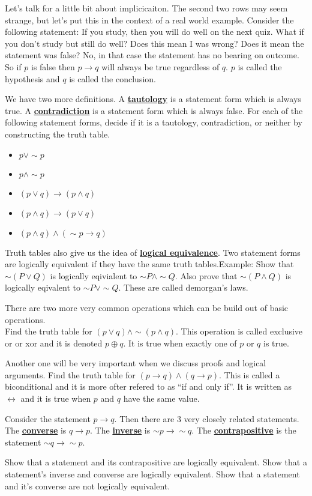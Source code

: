 \documentclass[14,fleqn]{article}
\newcommand{\defn}[1]{\textbf{\underline{#1}}}
\begin{document}
Let's talk for a little bit about implicicaiton. The second two rows may seem strange, but let's put this in the context of a real world example. Consider the following statement: If you study, then you will do well on the next quiz. What if you don't study but still do well? Does this mean I was wrong? Does it mean the statement was false? No, in that case the statement has no bearing on outcome.  So if $p$ is false then $p\to q$ will always be true regardless of $q.$ $p$ is called the hypothesis and $q$ is called the conclusion.

We have two more definitions. A \defn{tautology} is a statement form which is always true. A \defn{contradiction} is a statement form which is always false. For each of the following statement forms, decide if it is a tautology, contradiction, or neither by constructing the truth table.
\begin{itemize}
	\item $p\vee \sim p$
	\item $p\wedge \sim p$
	\item $(p\vee q)\to (p\wedge q)$
	\item $(p\wedge q)\to (p\vee q)$
	\item $(p\wedge q)\wedge(\sim p\to q)$
\end{itemize}

Truth tables also give us the idea of \defn{logical equivalence}. Two statement forms are logically equivalent if they have the same truth tables.Example: Show that $\sim(P\vee Q)$ is logically eqivialent to $\sim P\wedge \sim Q.$ Also prove that $\sim (P\wedge Q)$ is logically eqivalent to  $\sim P\vee \sim Q.$ These are called demorgan's laws.

There are two more very common operations which can be build out of basic operations.\\

Find the truth table for $(p\vee q)\wedge \sim (p\wedge q).$ This operation is called exclusive or or xor and it is denoted $p\oplus q.$ It is true when exactly one of $p$ or $q$ is true.

Another one will be very important when we discuss proofs and logical arguments. Find the truth table for $(p\to q)\wedge (q\to p).$ This is called a biconditional and it is more ofter refered to as ``if and only if''. It is written as $\leftrightarrow$ and it is true when $p$ and $q$ have the same value.

Consider the statement $p\to q.$ Then there are 3 very closely related statements. The \defn{converse} is $q\to p.$ The \defn{inverse} is $\sim p\to \sim q.$ The \defn{contrapositive} is the statement $\sim q\to \sim p.$

Show that a statement and its contrapositive are logically equivalent. Show that a statement's inverse and converse are logically equivalent. Show that a statement and it's converse are not logically equivalent.
\end{document}
